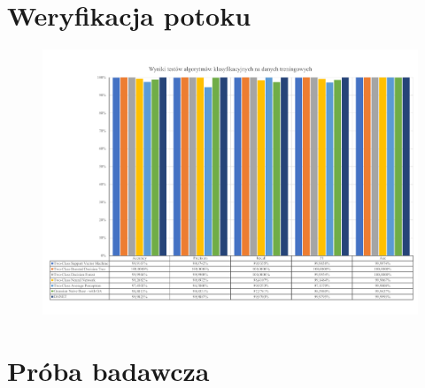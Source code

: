\section{Weryfikacja potoku}

\begin{landscape}
    \vspace*{\fill}
    \begin{figure}[H]
        \centering
        \includegraphics[height=0.8\textwidth]{images/predict_same}
        \label{fig:predict-same}
    \end{figure}
\vfill

\end{landscape}

\section{Próba badawcza}

